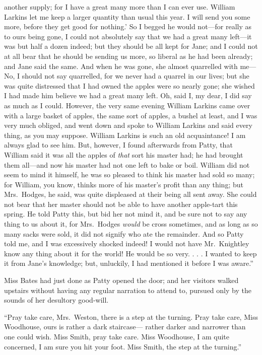 another supply; for I have a great many more than I can ever use.
William Larkins let me keep a larger quantity than usual this year.
I will send you some more, before they get good for nothing.'
So I begged he would not---for really as to ours being gone, I could
not absolutely say that we had a great many left---it was but half
a dozen indeed; but they should be all kept for Jane; and I could
not at all bear that he should be sending us more, so liberal as he
had been already; and Jane said the same.  And when he was gone,
she almost quarrelled with me---No, I should not say quarrelled,
for we never had a quarrel in our lives; but she was quite distressed
that I had owned the apples were so nearly gone; she wished I had
made him believe we had a great many left.  Oh, said I, my dear,
I did say as much as I could.  However, the very same evening
William Larkins came over with a large basket of apples, the same
sort of apples, a bushel at least, and I was very much obliged,
and went down and spoke to William Larkins and said every thing,
as you may suppose.  William Larkins is such an old acquaintance!
I am always glad to see him.  But, however, I found afterwards
from Patty, that William said it was all the apples of \emph{that} sort
his master had; he had brought them all---and now his master had not
one left to bake or boil.  William did not seem to mind it himself,
he was so pleased to think his master had sold so many; for William,
you know, thinks more of his master's profit than any thing;
but Mrs.\ Hodges, he said, was quite displeased at their being
all sent away.  She could not bear that her master should not be
able to have another apple-tart this spring.  He told Patty this,
but bid her not mind it, and be sure not to say any thing to us
about it, for Mrs.\ Hodges \emph{would} be cross sometimes, and as long as
so many sacks were sold, it did not signify who ate the remainder.
And so Patty told me, and I was excessively shocked indeed!
I would not have Mr.\ Knightley know any thing about it for
the world!  He would be so very. . . . I wanted to keep it from
Jane's knowledge; but, unluckily, I had mentioned it before I was
aware.''

Miss Bates had just done as Patty opened the door; and her visitors
walked upstairs without having any regular narration to attend to,
pursued only by the sounds of her desultory good-will.

``Pray take care, Mrs.\ Weston, there is a step at the turning.
Pray take care, Miss Woodhouse, ours is rather a dark staircase---%
rather darker and narrower than one could wish.  Miss Smith,
pray take care.  Miss Woodhouse, I am quite concerned, I am sure you
hit your foot.  Miss Smith, the step at the turning.''



